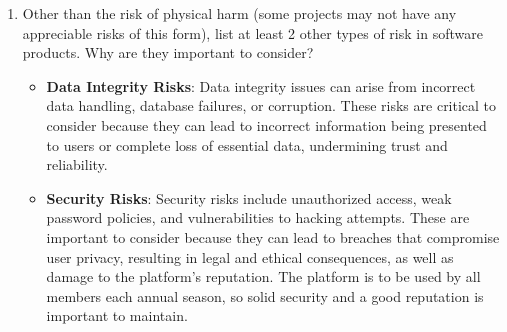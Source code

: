 \documentclass{article}
\begin{document}
\begin{enumerate}
    \item Other than the risk of physical harm (some projects may not have any
          appreciable risks of this form), list at least 2 other types of risk in
          software products. Why are they important to consider?

          \begin{itemize}
              \item \textbf{Data Integrity Risks}: Data integrity issues can arise from incorrect data handling, database failures, or corruption. These risks are critical to consider because they can lead to incorrect information being presented to users or complete loss of essential data, undermining trust and reliability.
              \item \textbf{Security Risks}: Security risks include unauthorized access, weak password policies, and vulnerabilities to hacking attempts. These are important to consider because they can lead to breaches that compromise user privacy, resulting in legal and ethical consequences, as well as damage to the platform's reputation. The platform is to be used by all members each annual season, so solid security and a good reputation is important to maintain.
          \end{itemize}

\end{enumerate}
\end{document}
